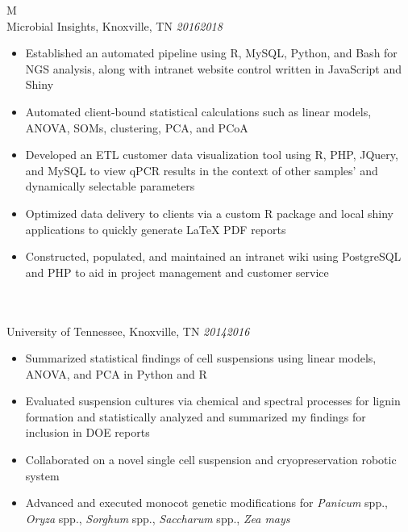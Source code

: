 \documentclass[10pt]{article}%
\begin{document}
    \begin{tabularx}{\linewidth}{M}%
         \\
        Microbial Insights, Knoxville, TN \textit{2016\textemdash{}2018} \\
        \begin{itemize}[topsep=-12pt,parsep=0em]
            \setlength\itemsep{0em}
            \item Established an automated pipeline using R, MySQL, Python, and Bash for NGS analysis, along with intranet website control written in JavaScript and Shiny  %
            \item Automated client-bound statistical calculations such as linear models, ANOVA, SOMs, clustering, PCA, and PCoA %
            \item Developed an ETL customer data visualization tool using R, PHP, JQuery, and MySQL to view qPCR results in the context of other samples' and dynamically selectable parameters %
            \item Optimized data delivery to clients via a custom R package and local shiny applications to quickly generate \LaTeX{} PDF reports  %
            \item Constructed, populated, and maintained an intranet wiki using PostgreSQL and PHP to aid in project management and customer service
        \end{itemize} \\
         \\
        University of Tennessee, Knoxville, TN \textit{2014\textemdash{}2016} \\
        \begin{itemize}[topsep=-12pt,parsep=0em]
            \setlength\itemsep{0em}
            \item Summarized statistical findings of cell suspensions using linear models, ANOVA, and PCA in Python and R %
            \item Evaluated suspension cultures via chemical and spectral processes for lignin formation and statistically analyzed and summarized my findings for inclusion in DOE reports %
            \item Collaborated on a novel single cell suspension and cryopreservation robotic system %
            \item Advanced and executed monocot genetic modifications for \textit{Panicum} spp., \textit{Oryza} spp., \textit{Sorghum} spp., \textit{Saccharum} spp., \textit{Zea mays}

\end{itemize}
\end{tabularx}
\end{document}
